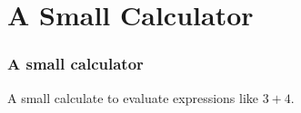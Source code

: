 \documentclass[mathserif,xcolor=svgnames]{beamer}
\renewcommand{\_}{\mathunderscore}
\begin{document}











\section{A Small Calculator}

\begin{frame}[fragile]
  \frametitle{A small calculator}
  A small calculate to evaluate expressions like $3 + 4$.
  
\end{frame}
\end{document}
